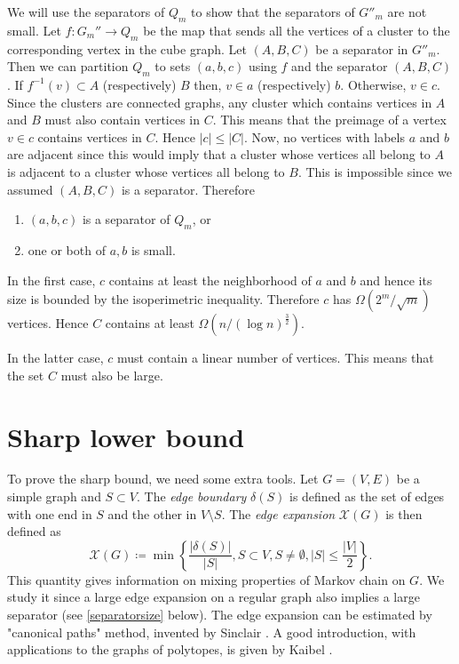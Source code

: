 \documentclass[a4paper,12pt]{book}
\theoremstyle{plain}
\theoremstyle{definition}
\begin{document}

We will use the separators of $Q_m$ to show that the separators of $G''_m$ are not small.
Let $f: G_m'' \rightarrow Q_m$ 
be the map that sends all the vertices of a cluster to the corresponding vertex 
in the cube graph. 
Let $(A,B,C)$ be a separator in $G''_m$. Then we can partition
$Q_m$ to sets $(a,b,c)$ using $f$ and the separator $(A,B,C)$. If $f^{-1}(v) \subset A$ (respectively) $B$ 
then, $v \in a$ (respectively) $b$. Otherwise, $v \in c$. Since the clusters are connected 
graphs, any cluster which contains vertices in $A$ and $B$ must also contain 
vertices in $C$. This means that the preimage of a vertex $v \in c$ contains vertices in $C$. Hence $|c| \leq |C|$. 
Now, no vertices with labels $a$ and $b$ are adjacent since this would imply 
that a cluster whose vertices all belong to $A$ is adjacent to a cluster whose vertices all belong to 
$B$. This is impossible since we assumed $(A,B,C)$ is a separator. Therefore
\begin{enumerate}
 \item $(a,b,c)$ is a separator of $Q_m$, or
\item one or both of $a,b$ is small.
\end{enumerate}
In the first case, $c$ contains at least the neighborhood of $a$ and $b$ and 
hence its size is bounded by the isoperimetric inequality. Therefore $c$ has 
$\Omega(2^m/\sqrt{m})$ vertices. Hence $C$ contains at least $\Omega(n/(\log 
n)^{\frac{3}{2}})$.

In the latter case, $c$ must contain a linear number of vertices. This means 
that the set $C$ must also be large.  

\section{Sharp lower bound}

To prove the sharp bound, we need some extra tools. Let $G= (V,E)$ be a simple graph and
 $S\subset V$. The \textit{edge boundary} $\delta(S)$ is defined as the set of edges with one end
in $S$ and the other in $V\setminus S$. The \textit{edge expansion} $\mathcal{X}(G)$ is then defined
as 
\begin{equation}
\mathcal{X}(G) \coloneqq  \min \left\{ \frac{ |\delta(S) |}{ |S |}, S \subset V, S\neq \emptyset, |S| \leq \frac{ |V |}{2}  \right\}.
\end{equation} 
This quantity gives information on mixing properties of Markov chain on $G$. We study it since
a large edge expansion on a regular graph also implies a large separator (see \ref{separatorsize} below).
The edge expansion can be estimated by "canonical paths" method, invented by Sinclair \cite{Sinclair}. 
A good introduction, with applications to the graphs of polytopes, is given by Kaibel \cite{Kaibel}. 
\end{document}
